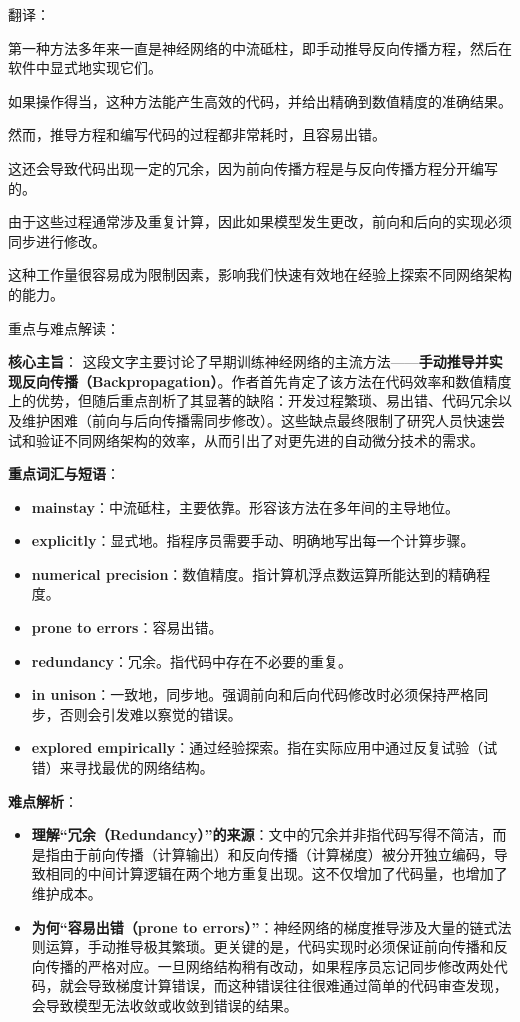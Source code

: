 \documentclass{article}
\begin{document}

{\color{red}
翻译：

第一种方法多年来一直是神经网络的中流砥柱，即手动推导反向传播方程，然后在软件中显式地实现它们。

如果操作得当，这种方法能产生高效的代码，并给出精确到数值精度的准确结果。

然而，推导方程和编写代码的过程都非常耗时，且容易出错。

这还会导致代码出现一定的冗余，因为前向传播方程是与反向传播方程分开编写的。

由于这些过程通常涉及重复计算，因此如果模型发生更改，前向和后向的实现必须同步进行修改。

这种工作量很容易成为限制因素，影响我们快速有效地在经验上探索不同网络架构的能力。
}

{\color{blue}
重点与难点解读：

\textbf{核心主旨}：
这段文字主要讨论了早期训练神经网络的主流方法——\textbf{手动推导并实现反向传播（Backpropagation）}。作者首先肯定了该方法在代码效率和数值精度上的优势，但随后重点剖析了其显著的缺陷：开发过程繁琐、易出错、代码冗余以及维护困难（前向与后向传播需同步修改）。这些缺点最终限制了研究人员快速尝试和验证不同网络架构的效率，从而引出了对更先进的自动微分技术的需求。

\textbf{重点词汇与短语}：
\begin{itemize}
    \item \textbf{mainstay}：中流砥柱，主要依靠。形容该方法在多年间的主导地位。
    \item \textbf{explicitly}：显式地。指程序员需要手动、明确地写出每一个计算步骤。
    \item \textbf{numerical precision}：数值精度。指计算机浮点数运算所能达到的精确程度。
    \item \textbf{prone to errors}：容易出错。
    \item \textbf{redundancy}：冗余。指代码中存在不必要的重复。
    \item \textbf{in unison}：一致地，同步地。强调前向和后向代码修改时必须保持严格同步，否则会引发难以察觉的错误。
    \item \textbf{explored empirically}：通过经验探索。指在实际应用中通过反复试验（试错）来寻找最优的网络结构。
\end{itemize}

\textbf{难点解析}：
\begin{itemize}
    \item \textbf{理解“冗余（Redundancy）”的来源}：文中的冗余并非指代码写得不简洁，而是指由于前向传播（计算输出）和反向传播（计算梯度）被分开独立编码，导致相同的中间计算逻辑在两个地方重复出现。这不仅增加了代码量，也增加了维护成本。
    \item \textbf{为何“容易出错（prone to errors）”}：神经网络的梯度推导涉及大量的链式法则运算，手动推导极其繁琐。更关键的是，代码实现时必须保证前向传播和反向传播的严格对应。一旦网络结构稍有改动，如果程序员忘记同步修改两处代码，就会导致梯度计算错误，而这种错误往往很难通过简单的代码审查发现，会导致模型无法收敛或收敛到错误的结果。
\end{itemize}

}
\end{document}
